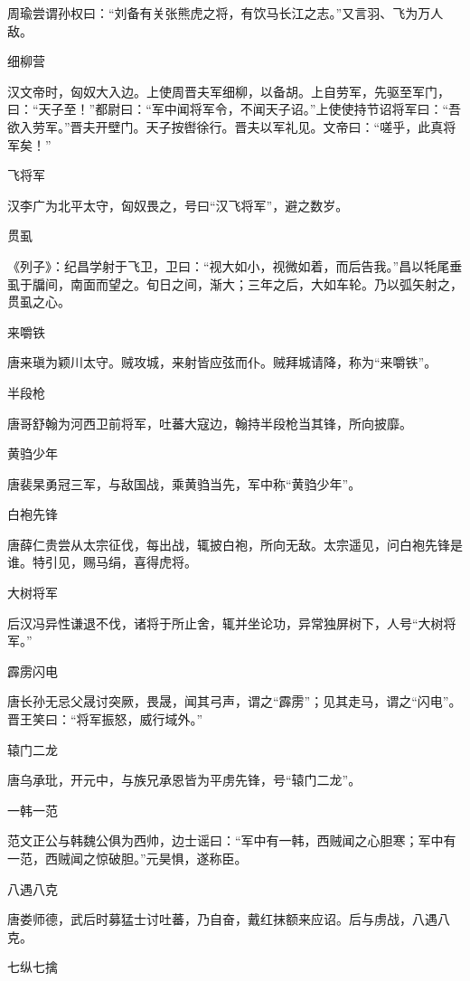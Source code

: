 \documentclass[a4paper,12pt,UTF8,twoside]{ctexbook}
\begin{document}
    周瑜尝谓孙权曰：“刘备有关张熊虎之将，有饮马长江之志。”又言羽、飞为万人敌。
    
    细柳营
    
    汉文帝时，匈奴大入边。上使周晋夫军细柳，以备胡。上自劳军，先驱至军门，曰：“天子至！”都尉曰：“军中闻将军令，不闻天子诏。”上使使持节诏将军曰：“吾欲入劳军。”晋夫开壁门。天子按辔徐行。晋夫以军礼见。文帝曰：“嗟乎，此真将军矣！”
    
    飞将军
    
    汉李广为北平太守，匈奴畏之，号曰“汉飞将军”，避之数岁。
    
    贯虱
    
    《列子》：纪昌学射于飞卫，卫曰：“视大如小，视微如着，而后告我。”昌以牦尾垂虱于牖间，南面而望之。旬日之间，渐大；三年之后，大如车轮。乃以弧矢射之，贯虱之心。
    
    来嚼铁
    
    唐来瑱为颖川太守。贼攻城，来射皆应弦而仆。贼拜城请降，称为“来嚼铁”。
    
    半段枪
    
    唐哥舒翰为河西卫前将军，吐蕃大寇边，翰持半段枪当其锋，所向披靡。
    
    黄驺少年
    
    唐裴杲勇冠三军，与敌国战，乘黄驺当先，军中称“黄驺少年”。
    
    白袍先锋
    
    唐薛仁贵尝从太宗征伐，每出战，辄披白袍，所向无敌。太宗遥见，问白袍先锋是谁。特引见，赐马绢，喜得虎将。
    
    大树将军
    
    后汉冯异性谦退不伐，诸将于所止舍，辄并坐论功，异常独屏树下，人号“大树将军。”
    
    霹雳闪电
    
    唐长孙无忌父晟讨突厥，畏晟，闻其弓声，谓之“霹雳”；见其走马，谓之“闪电”。晋王笑曰：“将军振怒，威行域外。”
    
    辕门二龙
    
    唐乌承玭，开元中，与族兄承恩皆为平虏先锋，号“辕门二龙”。
    
    一韩一范
    
    范文正公与韩魏公俱为西帅，边士谣曰：“军中有一韩，西贼闻之心胆寒；军中有一范，西贼闻之惊破胆。”元昊惧，遂称臣。
    
    八遇八克
    
    唐娄师德，武后时募猛士讨吐蕃，乃自奋，戴红抹额来应诏。后与虏战，八遇八克。
    
    七纵七擒
    
\end{document}
